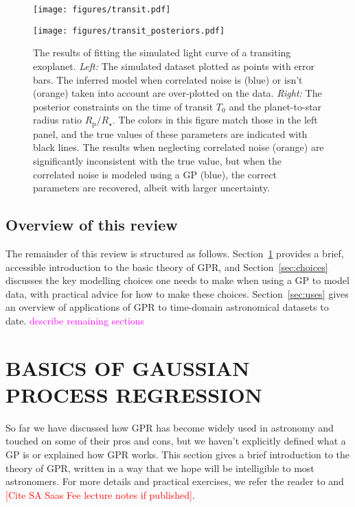 \documentclass[letterpaper]{ar-1col}
\newcommand{\suz}[1]{\textcolor{magenta}{#1}}
\begin{document}
\begin{figure}[ht]
  \centering
  \begin{minipage}[t]{0.5\linewidth}
    \texttt{[image: figures/transit.pdf]}
  \end{minipage} \hfill
  \begin{minipage}[t]{0.44\linewidth}
    \texttt{[image: figures/transit\_posteriors.pdf]}
  \end{minipage}
  \caption{The results of fitting the simulated light curve of a transiting exoplanet.
  \emph{Left:} The simulated dataset plotted as points with error bars.
  The inferred model when correlated noise is (blue) or isn't (orange) taken into account are over-plotted on the data.
  \emph{Right:} The posterior constraints on the time of transit $T_0$ and the planet-to-star radius ratio $R_\mathrm{p}/R_\star$.
  The colors in this figure match those in the left panel, and the true values of these parameters are indicated with black lines.
  The results when neglecting correlated noise (orange) are significantly inconsistent with the true value, but when the correlated noise is modeled using a GP (blue), the correct parameters are recovered, albeit with larger uncertainty.}
  \label{fig:transit}
\end{figure}


\subsection{Overview of this review}

The remainder of this review is structured as follows. Section~\ref{sec:basics} provides a brief, accessible introduction to the basic theory of GPR, and Section~\ref{sec:choices} discusses the key modelling choices one needs to make when using a GP to model data, with practical advice for how to make these choices. Section~\ref{sec:uses} gives an overview of applications of GPR to time-domain astronomical datasets to date. \suz{describe remaining sections}


\section{BASICS OF GAUSSIAN PROCESS REGRESSION}
\label{sec:basics}

So far we have discussed how GPR has become widely used in astronomy and touched on some of their pros and cons, but we haven't explicitly defined what a GP is or explained how GPR works. This section gives a brief introduction to the theory of GPR, written in a way that we hope will be intelligible to most astronomers. For more details and practical exercises, we refer the reader to \citet{gpml} and \textcolor{red}{[Cite SA Saas Fee lecture notes if published]}.
\end{document}
